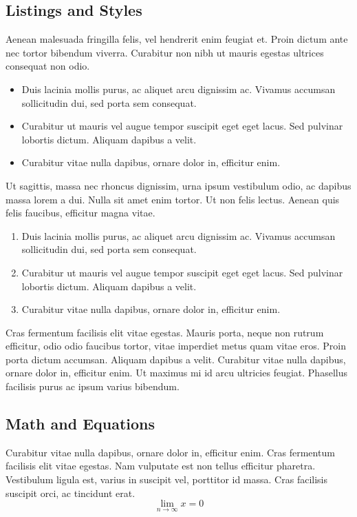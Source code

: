 \documentclass[sigconf, nonacm]{acmart}
\begin{document}
\subsection{Listings and Styles}

Aenean malesuada fringilla felis, vel hendrerit enim feugiat et. Proin dictum ante nec tortor bibendum viverra. Curabitur non nibh ut mauris egestas ultrices consequat non odio.

\begin{itemize}
\item Duis lacinia mollis purus, ac aliquet arcu dignissim ac. Vivamus accumsan sollicitudin dui, sed porta sem consequat.
\item Curabitur ut mauris vel augue tempor suscipit eget eget lacus. Sed pulvinar lobortis dictum. Aliquam dapibus a velit.
\item Curabitur vitae nulla dapibus, ornare dolor in, efficitur enim.
\end{itemize}

Ut sagittis, massa nec rhoncus dignissim, urna ipsum vestibulum odio, ac dapibus massa lorem a dui. Nulla sit amet enim tortor. Ut non felis lectus. Aenean quis felis faucibus, efficitur magna vitae. 

\begin{enumerate}
\item Duis lacinia mollis purus, ac aliquet arcu dignissim ac. Vivamus accumsan sollicitudin dui, sed porta sem consequat.
\item Curabitur ut mauris vel augue tempor suscipit eget eget lacus. Sed pulvinar lobortis dictum. Aliquam dapibus a velit.
\item Curabitur vitae nulla dapibus, ornare dolor in, efficitur enim.
\end{enumerate}

Cras fermentum facilisis elit vitae egestas. Mauris porta, neque non rutrum efficitur, odio odio faucibus tortor, vitae imperdiet metus quam vitae eros. Proin porta dictum accumsan. Aliquam dapibus a velit. Curabitur vitae nulla dapibus, ornare dolor in, efficitur enim. Ut maximus mi id arcu ultricies feugiat. Phasellus facilisis purus ac ipsum varius bibendum.

\subsection{Math and Equations}

Curabitur vitae nulla dapibus, ornare dolor in, efficitur enim. Cras fermentum facilisis elit vitae egestas. Nam vulputate est non tellus efficitur pharetra. Vestibulum ligula est, varius in suscipit vel, porttitor id massa. Cras facilisis suscipit orci, ac tincidunt erat.
\begin{equation}
  \lim_{n\rightarrow \infty}x=0
\end{equation}
\end{document}
